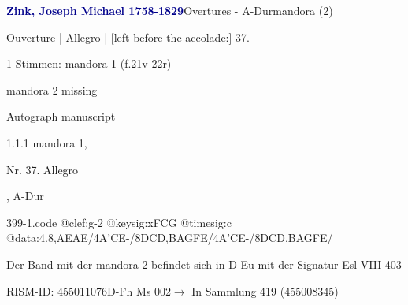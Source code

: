 \documentclass[twocolumn]{book}
\begin{document}
\par \vspace{7pt} \textcolor{darkblue}{\textbf{Zink, Joseph Michael  1758-1829}}\hfillplus{\textbf{[399]}}\newline Overtures - A-Dur\newline mandora (2)
\par \begin{itshape}[f.21v, at left:] Ouverture | Allegro | [left before the accolade:] 37.\end{itshape} 
\par \textcolor{darkblue}{}  1 Stimmen: mandora 1  (f.21v-22r)\newline \begin{small} mandora 2 missing\end{small} \newline Autograph manuscript
\par 1.1.1  mandora 1, \begin{itshape}Nr. 37. Allegro\end{itshape}, A-Dur  
\begin{filecontents*}{399-1.code}
@clef:g-2
@keysig:xFCG
@timesig:c
@data:4.8,AEAE/4A'CE-/{8DC}{D,B}{AG}{FE}/4A'CE-/{8DC}{D,B}{AG}{FE}/
\end{filecontents*}
\newline
%
\par Der Band mit der mandora 2 befindet sich in D Eu mit der Signatur Esl VIII 403
\par RISM-ID: 455011076\newline D-Fh  Ms 002\newline $\rightarrow$ In Sammlung 419 (455008345)
      
\end{document}
